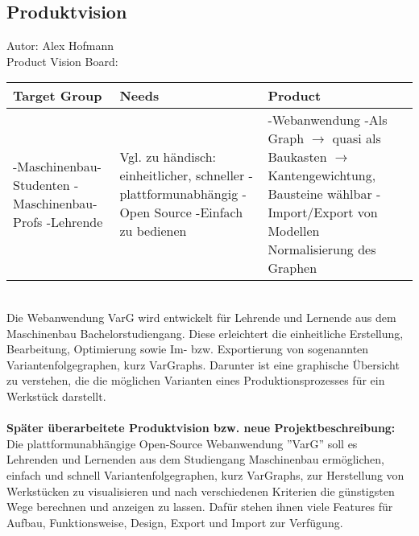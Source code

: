 \documentclass[twoside]{report}
\begin{document}
\subsection{Produktvision}
{\small Autor: Alex Hofmann}
\\

\noindent Product Vision Board: \\
\begin{tabular}{|p{50mm}|p{50mm}|p{50mm}|}
  \hline
  \textbf{Target Group}                                                  & \textbf{Needs}                                                                                                                        & \textbf{Product}                                                                                                                                                                                                 \\
  \hline
  -Maschinenbau-Studenten \newline -Maschinenbau-Profs \newline -Lehrende & Vgl. zu händisch: \newline einheitlicher, schneller \newline -plattformunabhängig \newline -Open Source \newline -Einfach zu bedienen & -Webanwendung \newline -Als Graph \newline $\rightarrow$ quasi als Baukasten \newline $\rightarrow$ Kantengewichtung, Bausteine wählbar \newline -Import/Export von Modellen \newline Normalisierung des Graphen \\
  \hline
\end{tabular}
\\

\noindent Die Webanwendung VarG wird entwickelt für Lehrende und Lernende aus dem Maschinenbau Bachelorstudiengang.
Diese erleichtert die einheitliche Erstellung, Bearbeitung, Optimierung sowie Im- bzw. Exportierung von sogenannten Variantenfolgegraphen, kurz VarGraphs. Darunter ist eine graphische Übersicht zu verstehen, die die möglichen Varianten eines Produktionsprozesses für ein Werkstück darstellt.
\\
\\\textbf{Später überarbeitete Produktvision bzw. neue Projektbeschreibung:}
\\Die plattformunabhängige Open-Source Webanwendung ''VarG'' soll es Lehrenden und Lernenden aus dem Studiengang Maschinenbau ermöglichen, einfach und schnell Variantenfolgegraphen, kurz VarGraphs, zur Herstellung von Werkstücken zu visualisieren und nach verschiedenen Kriterien die günstigsten Wege berechnen und anzeigen zu lassen. Dafür stehen ihnen viele Features für Aufbau, Funktionsweise, Design, Export und Import zur Verfügung.
\end{document}
